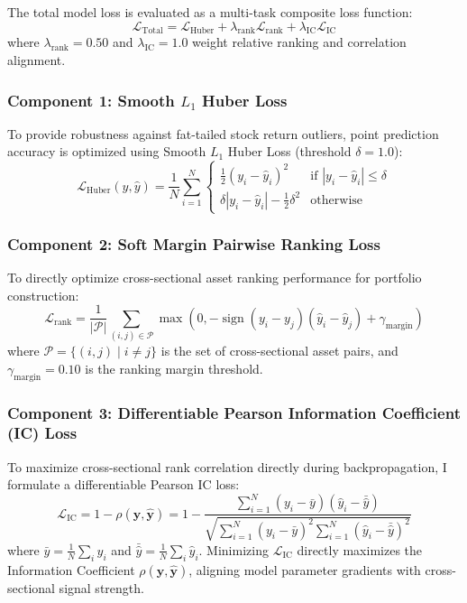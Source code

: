 The total model loss is evaluated as a multi-task composite loss function:
\begin{equation}
\mathcal{L}_{\text{Total}} = \mathcal{L}_{\operatorname{Huber}} + \lambda_{\text{rank}} \mathcal{L}_{\text{rank}} + \lambda_{\operatorname{IC}} \mathcal{L}_{\operatorname{IC}}
\label{eq:ch4_multitask_loss}
\end{equation}
where $\lambda_{\text{rank}} = 0.50$ and $\lambda_{\operatorname{IC}} = 1.0$ weight relative ranking and correlation alignment.

\subsubsection{Component 1: Smooth $L_1$ Huber Loss}
To provide robustness against fat-tailed stock return outliers, point prediction accuracy is optimized using Smooth $L_1$ Huber Loss (threshold $\delta = 1.0$):
\begin{equation}
\mathcal{L}_{\operatorname{Huber}}(y, \hat{y}) = \frac{1}{N} \sum_{i=1}^N \begin{cases} 
\frac{1}{2} (y_i - \hat{y}_i)^2 & \text{if } |y_i - \hat{y}_i| \le \delta \\
\delta |y_i - \hat{y}_i| - \frac{1}{2}\delta^2 & \text{otherwise}
\end{cases}
\label{eq:ch4_huber_loss}
\end{equation}

\subsubsection{Component 2: Soft Margin Pairwise Ranking Loss}
To directly optimize cross-sectional asset ranking performance for portfolio construction:
\begin{equation}
\mathcal{L}_{\text{rank}} = \frac{1}{|\mathcal{P}|} \sum_{(i,j) \in \mathcal{P}} \max\left( 0, -\operatorname{sign}(y_i - y_j)(\hat{y}_i - \hat{y}_j) + \gamma_{\text{margin}} \right)
\label{eq:ch4_ranking_loss}
\end{equation}
where $\mathcal{P} = \{(i,j) \mid i \neq j\}$ is the set of cross-sectional asset pairs, and $\gamma_{\text{margin}} = 0.10$ is the ranking margin threshold.

\subsubsection{Component 3: Differentiable Pearson Information Coefficient (IC) Loss}
To maximize cross-sectional rank correlation directly during backpropagation, I formulate a differentiable Pearson IC loss:
\begin{equation}
\mathcal{L}_{\operatorname{IC}} = 1 - \rho(\mathbf{y}, \hat{\mathbf{y}}) = 1 - \frac{\sum_{i=1}^N (y_i - \bar{y})(\hat{y}_i - \bar{\hat{y}})}{\sqrt{ \sum_{i=1}^N (y_i - \bar{y})^2 \sum_{i=1}^N (\hat{y}_i - \bar{\hat{y}})^2 }}
\label{eq:ch4_ic_loss}
\end{equation}
where $\bar{y} = \frac{1}{N}\sum_i y_i$ and $\bar{\hat{y}} = \frac{1}{N}\sum_i \hat{y}_i$. Minimizing $\mathcal{L}_{\operatorname{IC}}$ directly maximizes the Information Coefficient $\rho(\mathbf{y}, \hat{\mathbf{y}})$, aligning model parameter gradients with cross-sectional signal strength.

